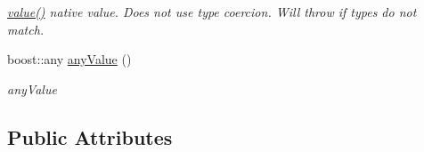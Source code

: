 \begin{DoxyCompactItemize}
\begin{DoxyCompactList}\small\item\em \hyperlink{classAbstractPropertyType_ae723621925382263eba046fa1ca8e36d}{value()} native value. Does not use type coercion. Will throw if types do not match. \end{DoxyCompactList}\item 
boost\-::any \hyperlink{classAbstractPropertyType_a7ba4118acb746d2b8fc220a12b0e2666}{any\-Value} ()
\begin{DoxyCompactList}\small\item\em any\-Value \end{DoxyCompactList}\end{DoxyCompactItemize}
\subsection*{Public Attributes}
